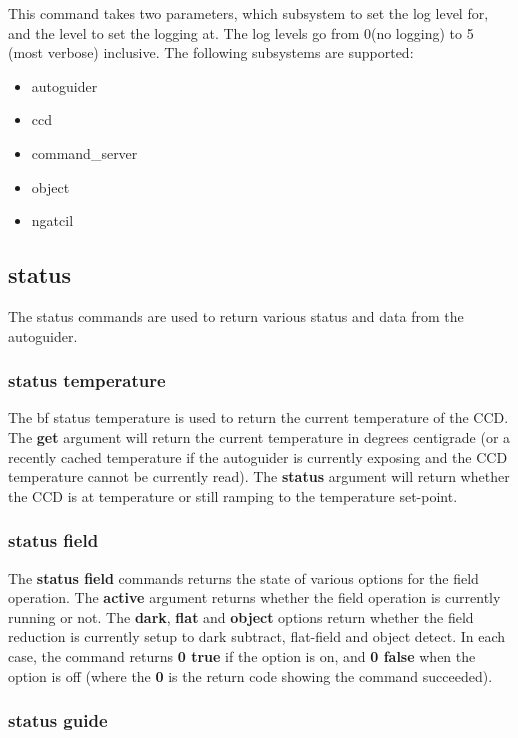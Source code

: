 \documentclass[10pt,a4paper]{article}
\begin{document}
This command takes two parameters, which subsystem to set the log level for, and the level to set the logging at. The log levels go from 0(no logging) to 5 (most verbose) inclusive. The following subsystems are supported:

\begin{itemize}
\item autoguider
\item ccd
\item command\_server
\item object
\item ngatcil
\end{itemize}

\subsection{status}

The status commands are used to return various status and data from the autoguider.

\subsubsection{status temperature}

The {bf status temperature} is used to return the current temperature of the CCD. The {\bf get} argument will return the current temperature in degrees centigrade (or a recently cached temperature if the autoguider is currently exposing and the CCD temperature cannot be currently read). The {\bf status} argument will return whether the CCD is at temperature or still ramping to the temperature set-point.

\subsubsection{status field}

The {\bf status field} commands returns the state of various options for the field operation. The {\bf active} argument returns whether the field operation is currently running or not. The {\bf dark}, {\bf flat} and {\bf object} options return whether the field reduction is currently setup to dark subtract, flat-field and object detect. In each case, the command returns {\bf 0 true} if the option is on, and {\bf 0 false} when the option is off (where the {\bf 0} is the return code showing the command succeeded).

\subsubsection{status guide}
\end{document}
